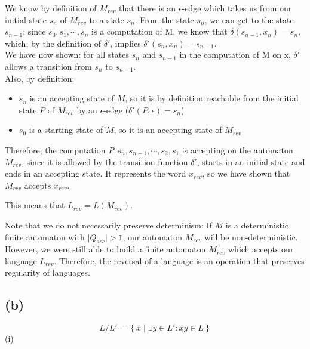 \begin{itemize}
    We know by definition of $M_{rev}$ that there is an $\epsilon$-edge which takes us from our initial state $s_{n}$ of $M_{rev}$ to a state $s_{n}$. From the state $s_{n}$, we can get to the state $s_{n-1}$: since $s_{0}, s_{1}, \cdots, s_{n}$ is a computation of M, we know that $\delta(s_{n-1}, x_{n})=s_{n}$, which, by the definition of $\delta'$, implies $\delta'(s_{n},x_{n})=s_{n-1}$.\\
    We have now shown: for all states $s_{n}$ and $s_{n-1}$ in the computation of M on x, $\delta'$ allows a transition from $s_{n}$ to $s_{n-1}$.\\
    Also, by definition:
    \begin{itemize}
        \item $s_{n}$ is an accepting state of $M$, so it is by definition reachable from the initial state $P$ of $M_{rev}$ by an $\epsilon$-edge ($\delta'(P,\epsilon)=s_{n}$)
        \item $s_{0}$ is a starting state of $M$, so it is an accepting state of $M_{rev}$
    \end{itemize}
    Therefore, the computation $P,s_{n},s_{n-1},\cdots,s_{2},s_{1}$ is accepting on the automaton $M_{rev}$, since it is allowed by the transition function $\delta'$, starts in an initial state and ends in an accepting state. It represents the word $x_{rev}$, so we have shown that $M_{rev}$ accepts $x_{rev}$.
\end{itemize}
This means that $L_{rev}=L(M_{rev})$. \qedsymbol{}

Note that we do not necessarily preserve determinism: If $M$ is a deterministic finite automaton with $\lvert Q_{acc} \rvert > 1$, our automaton $M_{rev}$ will be non-deterministic.\\
However, we were still able to build a finite automaton $M_{rev}$ which accepts our language $L_{rev}$. Therefore, the reversal of a language is an operation that preserves regularity of languages.

\subsection{(b)}
$$L/L' = \left\{ x\mid \exists y \in L' : xy \in L\right\}$$
\noindent (i)\\

